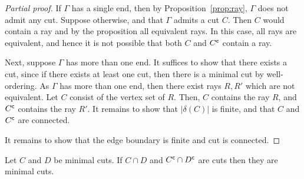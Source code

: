 \begin{proof}[Partial proof]
    If \(\Gamma\) has a single end, then by Proposition~\ref{prop:ray}, \(\Gamma\) does not admit any cut. Suppose otherwise, and that \(\Gamma\) admits a cut \(C\). Then \(C\) would contain a ray and by the proposition all equivalent rays. In this case, all rays are equivalent, and hence it is not possible that both \(C\) and \({C}^{\mathsf{c}}\) contain a ray.

    Next, suppose \(\Gamma\) has more than one end. It suffices to show that there exists a cut, since if there exists at least one cut, then there is a minimal cut by well-ordering. As \(\Gamma\) has more than one end, then there exist rays \(R, R'\) which are not equivalent. Let \(C\) consist of the vertex set of \(R\). Then, \(C\) contains the ray \(R\), and \({C}^{\mathsf{c}}\) contains the ray \(R'\). 
    It remains to show that \(|\delta(C)|\) is finite, and that \(C\) and \({C}^{\mathsf{c}}\) are connected.
    
    It remains to show that the edge boundary is finite and cut is connected.
\end{proof}

\begin{lemma}
\label{lem:mincuts}
    Let \(C\) and \(D\) be minimal cuts. If \(C \cap D\) and \({C}^{\mathsf{c}} \cap {D}^{\mathsf{c}}\) are cuts then
they are minimal cuts.
\end{lemma}

